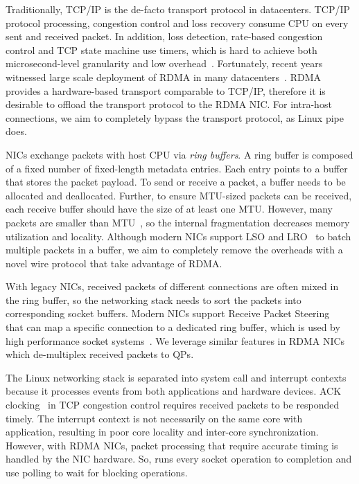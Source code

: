 Traditionally, TCP/IP is the de-facto transport protocol in datacenters.
TCP/IP protocol processing, congestion control and loss recovery consume CPU on every sent and received packet.
In addition, loss detection, rate-based congestion control and TCP state machine use timers, which is hard to achieve both microsecond-level granularity and low overhead~\cite{jeong2014mtcp}.
Fortunately, recent years witnessed large scale deployment of RDMA in many datacenters~\cite{guo2016rdma,zhu2015congestion,mittal2015timely}.
RDMA provides a hardware-based transport comparable to TCP/IP, therefore it is desirable to offload the transport protocol to the RDMA NIC.
For intra-host connections, we aim to completely bypass the transport protocol, as Linux pipe does.

NICs exchange packets with host CPU via \emph{ring buffers}.
A ring buffer is composed of a fixed number of fixed-length metadata entries.
Each entry points to a buffer that stores the packet payload.
To send or receive a packet, a buffer needs to be allocated and deallocated.
Further, to ensure MTU-sized packets can be received, each receive buffer should have the size of at least one MTU.
However, many packets are smaller than MTU~\cite{thompson1997wide}, so the internal fragmentation decreases memory utilization and locality.
Although modern NICs support LSO and LRO~\cite{lsolro} to batch multiple packets in a buffer, we aim to completely remove the overheads with a novel wire protocol that take advantage of RDMA.

With legacy NICs, received packets of different connections are often mixed in the ring buffer, so the networking stack needs to sort the packets into corresponding socket buffers.
Modern NICs support Receive Packet Steering~\cite{mellanox} that can map a specific connection to a dedicated ring buffer, which is used by high performance socket systems~\cite{jeong2014mtcp,lin2016scalable,libvma}.
We leverage similar features in RDMA NICs which de-multiplex received packets to  QPs.

The Linux networking stack is separated into system call and interrupt contexts because it processes events from both applications and hardware devices.
ACK clocking~\cite{mprdma} in TCP congestion control requires received packets to be responded timely.
The interrupt context is not necessarily on the same core with application, resulting in poor core locality and inter-core synchronization.
However, with RDMA NICs, packet processing that require accurate timing is handled by the NIC hardware.
So, \libipc{} runs every socket operation to completion and use polling to wait for blocking operations.


